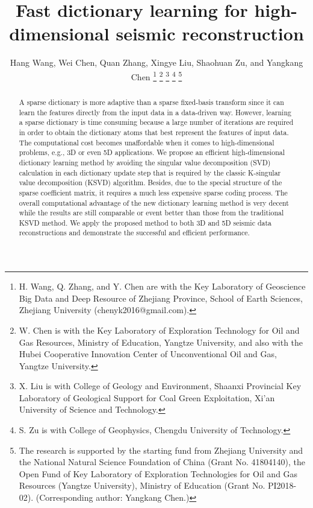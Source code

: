 \title{Fast dictionary learning for high-dimensional seismic reconstruction}
\renewcommand{\thefootnote}{\fnsymbol{footnote}}
\author{Hang Wang, Wei Chen, Quan Zhang, Xingye Liu, Shaohuan Zu, and Yangkang Chen
\thanks{H. Wang, Q. Zhang, and Y. Chen are with the Key Laboratory of Geoscience Big Data and Deep Resource of Zhejiang Province, School of Earth Sciences, Zhejiang University (chenyk2016@gmail.com).}
\thanks{W. Chen is with the Key Laboratory of Exploration Technology for Oil and Gas Resources, Ministry of Education, Yangtze University, and also with the Hubei Cooperative Innovation Center of Unconventional Oil and Gas, Yangtze University.}
\thanks{X. Liu is with College of Geology and Environment, Shaanxi Provincial Key Laboratory of Geological Support for Coal Green Exploitation, Xi'an University of Science and Technology.}
\thanks{S. Zu is with College of Geophysics, Chengdu University of Technology.}
\thanks{The research is supported by the starting fund from Zhejiang University and the National Natural Science Foundation of China (Grant No. 41804140), the Open Fund of Key Laboratory of Exploration Technologies for Oil and Gas Resources (Yangtze University), Ministry of Education (Grant No. PI2018-02). (Corresponding author: Yangkang Chen.)}}
\maketitle


\begin{abstract}
A sparse dictionary is more adaptive than a sparse fixed-basis transform since it can learn the features directly from the input data in a data-driven way.  However, learning a sparse dictionary is time consuming because a large number of iterations are required in order to obtain the dictionary atoms that best represent the features of input data. The computational cost becomes unaffordable when it comes to high-dimensional problems, e.g., 3D or even 5D applications. We propose an efficient high-dimensional dictionary learning method by avoiding the singular value decomposition (SVD) calculation in each dictionary update step that is required by the classic K-singular value decomposition (KSVD) algorithm. Besides, due to the special structure of the sparse coefficient matrix, it requires a much less expensive sparse coding process. The overall computational advantage of the new dictionary learning method is very decent while the results are still comparable or event better than those from the traditional KSVD method. We apply the proposed method to both 3D and 5D seismic data reconstructions and demonstrate the successful and efficient performance.
\end{abstract}

